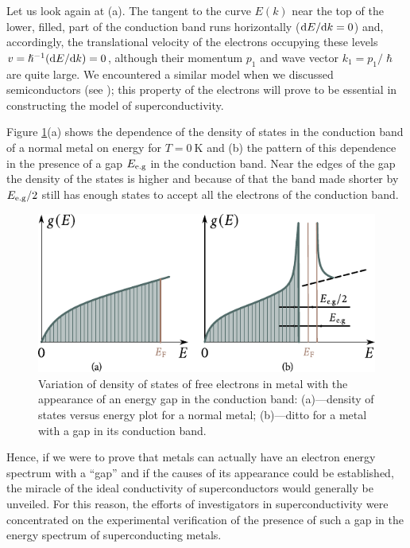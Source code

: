Let us look again at (a). The tangent to the curve $E(k)$ near the top of the lower, filled, part of the conduction band runs horizontally ($\mathrm{d} E/\mathrm{d} k=0$) and, accordingly, the translational velocity of the electrons occupying these levels $v=\hslash^{-1}(\mathrm{d} E/\mathrm{d} k)=0$, although their momentum $p_1$ and wave vector $k_1=p_1/\hslash$ are quite large. We encountered a similar model when we discussed semiconductors (see ); this property of the electrons will prove to be essential in constructing the model of superconductivity.

Figure \ref{fig:6_30}(a) shows the dependence of the density of states in the conduction band of a normal metal on energy for $T=\SI{0}{\kelvin}$ and (b) the pattern of this dependence in the presence of a gap $E_{\text{e.g}}$ in the conduction band. Near the edges of the gap the density of the states is higher and because of that the band made shorter by $E_{\text{e.g}}/2$ still has enough states to accept all the electrons of the conduction band.

\begin{figure}[t]
	\begin{center}
		\includegraphics[scale=1.05]{figures/ch_06/fig_6_30.pdf}
		\caption[]{Variation of density of states of free electrons in metal with the appearance of an energy gap in the conduction band: (a)---density of states versus energy plot for a normal metal; (b)---ditto for a metal with a gap in its conduction band.}
		\label{fig:6_30}
	\end{center}
	\vspace{-0.7cm}
\end{figure}

Hence, if we were to prove that metals can actually have an electron energy spectrum with a ``gap'' and if the causes of its appearance could be established, the miracle of the ideal conductivity of superconductors would generally be unveiled. For this reason, the efforts of investigators in superconductivity were concentrated on the experimental verification of the presence of such a gap in the energy spectrum of superconducting metals.

